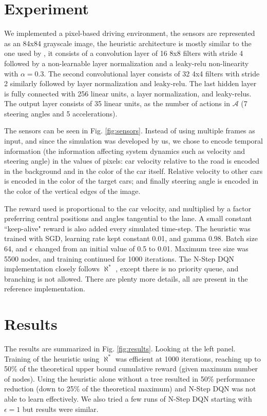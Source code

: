\documentclass{article}
\newcommand{\alephstar}{$\aleph^*$ }
\begin{document}
\section{Experiment}
\label{sec:experiment}

We implemented a pixel-based driving environment, the sensors are represented as an 84x84 grayscale image, the heuristic architecture is mostly similar to the one used by \cite{mnih2013playing}, it consists of a convolution layer of 16 8x8 filters with stride 4 followed by a non-learnable layer normalization \citep{ba2016layer} and a leaky-relu non-linearity \citep{xu2015empirical} with $\alpha=0.3$. The second convolutional layer consists of 32 4x4 filters with stride 2 similarly followed by layer normalization and leaky-relu. The last hidden layer is fully connected with 256 linear units, a layer normalization, and leaky-relus. The output layer consists of 35 linear units, as the number of actions in $\mathcal{A}$ (7 steering angles and 5 accelerations).

The sensors can be seen in Fig. \ref{fig:sensors}. Instead of using multiple frames as input, and since the simulation was developed by us, we chose to encode temporal information (the information affecting system dynamics such as velocity and steering angle) in the values of pixels: car velocity relative to the road is encoded in the background and in the color of the car itself. Relative velocity to other cars is encoded in the color of the target cars; and finally steering angle is encoded in the color of the vertical edges of the image.

The reward used is proportional to the car velocity, and multiplied by a factor preferring central positions and angles tangential to the lane. A small constant ``keep-alive" reward is also added every simulated time-step. The heuristic was trained with SGD, learning rate kept constant 0.01, and gamma 0.98. Batch size 64, and $\epsilon$ changed from an initial value of 0.5 to 0.01. Maximum tree size was 5500 nodes, and training continued for 1000 iterations. The N-Step DQN implementation closely follows \alephstar, except there is no priority queue, and branching is not allowed. There are plenty more details, all are present in the reference implementation.


\section{Results}
\label{sec:results}

The results are summarized in Fig. \ref{fig:results}. Looking at the left panel. Training of the heuristic using \alephstar was efficient at 1000 iterations, reaching up to 50\% of the theoretical upper bound cumulative reward (given maximum number of nodes). Using the heuristic alone without a tree resulted in 50\% performance reduction (down to 25\% of the theoretical maximum) and N-Step DQN was not able to learn effectively. We also tried a few runs of N-Step DQN starting with $\epsilon=1$ but results were similar.
\end{document}
